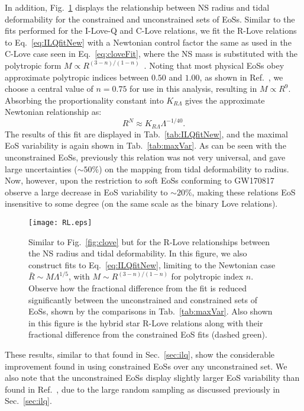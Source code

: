 \documentclass[prd,twocolumn,nofootinbib,superscriptaddress,amsmath,amssymb]{revtex4-1}
\begin{document}
In addition, Fig.~\ref{fig:rlove} displays the relationship between NS radius and tidal deformability for the constrained and unconstrained sets of EoSs.
Similar to the fits performed for the I-Love-Q and C-Love relations, we fit the R-Love relations to Eq.~\ref{eq:ILQfitNew} with a Newtonian control factor the same as used in the C-Love case seen in Eq.~\ref{eq:cloveFit}, where the NS mass is substituted with the polytropic form $M\propto R^{(3-n)/(1-n)}$~\cite{Shapiro:MRpolytrope}.
Noting that most physical EoSs obey approximate polytropic indices between $0.50$ and $1.00$, as shown in Ref.~\cite{Yagi:binLove}, we choose a central value of $n=0.75$ for use in this analysis, resulting in $M\propto R^9$.
Absorbing the proportionality constant into $K_{R\Lambda}$ gives the approximate Newtonian relationship as:
\begin{equation}
R^N \approx K_{R\Lambda}\Lambda^{-1/40}.
\end{equation}
The results of this fit are displayed in Tab.~\ref{tab:ILQfitNew}, and the maximal EoS variability is again shown in Tab.~\ref{tab:maxVar}.
As can be seen with the unconstrained EoSs, previously this relation was not very universal, and gave large uncertainties ($\sim50\%$) on the mapping from tidal deformability to radius.
Now, however, upon the restriction to soft EoSs conforming to GW170817 observe a large decrease in EoS variability to $\sim20\%$, making these relations EoS insensitive to some degree (on the same scale as the binary Love relations).
\begin{figure}
\begin{center} 
\texttt{[image: RL.eps]}
\end{center}
\caption{
Similar to Fig.~\ref{fig:clove} but for the R-Love relationships between the NS radius and tidal deformability.
In this figure, we also construct fits to  Eq.~\ref{eq:ILQfitNew}, limiting to the Newtonian case $\bar{R} \sim M\Lambda^{1/5}$, with $M\sim R^{(3-n)/(1-n)}$ for polytropic index $n$.
Observe how the fractional difference from the fit is reduced significantly between the unconstrained and constrained sets of EoSs, shown by the comparisons in Tab.~\ref{tab:maxVar}.
Also shown in this figure is the hybrid star R-Love relations along with their fractional difference from the constrained EoS fits (dashed green).
}
\label{fig:rlove}
\end{figure} 

These results, similar to that found in Sec.~\ref{sec:ilq}, show the considerable improvement found in using constrained EoSs over any unconstrained set.
We also note that the unconstrained EoSs display slightly larger EoS variability than found in Ref.~\cite{Yagi:binLove}, due to the large random sampling as discussed previously in Sec.~\ref{sec:ilq}.
\end{document}
